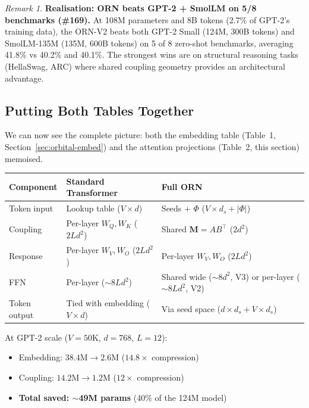 \documentclass[11pt, a4paper]{article}
\newcommand{\M}{\mathbf{M}}
\theoremstyle{remark}
\newtheorem*{remark}{Remark}
\begin{document}
\begin{remark}
\textbf{Realisation: ORN beats GPT-2 + SmolLM on 5/8 benchmarks (\#169).}
At 108M parameters and 8B tokens (2.7\% of GPT-2's training data), the ORN-V2 beats both GPT-2 Small (124M, 300B tokens) and SmolLM-135M (135M, 600B tokens) on 5 of 8 zero-shot benchmarks, averaging 41.8\% vs 40.2\% and 40.1\%.
The strongest wins are on structural reasoning tasks (HellaSwag, ARC) where shared coupling geometry provides an architectural advantage.
\end{remark}

\subsection{Putting Both Tables Together}
\label{sec:grn:full-picture}

We can now see the complete picture: both the embedding table (Table~1, Section~\ref{sec:orbital-embed}) and the attention projections (Table~2, this section) memoised.

\begin{center}\small
\renewcommand{\arraystretch}{1.3}
\begin{tabular}{@{}lll@{}}
\toprule
\textbf{Component} & \textbf{Standard Transformer} & \textbf{Full ORN} \\
\midrule
Token input & Lookup table ($V \times d$) & Seeds + $\Phi$ ($V \times d_s + |\Phi|$) \\
Coupling & Per-layer $W_Q, W_K$ ($2Ld^2$) & Shared $\M = AB^\top$ ($2d^2$) \\
Response & Per-layer $W_V, W_O$ ($2Ld^2$) & Per-layer $W_V, W_O$ ($2Ld^2$) \\
FFN & Per-layer ($\sim 8Ld^2$) & Shared wide ($\sim 8d^2$, V3) or per-layer ($\sim 8Ld^2$, V2) \\
Token output & Tied with embedding ($V \times d$) & Via seed space ($d \times d_s + V \times d_s$) \\
\bottomrule
\end{tabular}
\end{center}

\noindent
At GPT-2 scale ($V = 50\text{K}$, $d = 768$, $L = 12$):
\begin{itemize}[nosep]
    \item Embedding: $38.4\text{M} \to 2.6\text{M}$ ($14.8\times$ compression)
    \item Coupling: $14.2\text{M} \to 1.2\text{M}$ ($12\times$ compression)
    \item \textbf{Total saved: $\sim$49M params} (40\% of the 124M model)
\end{itemize}
\end{document}
